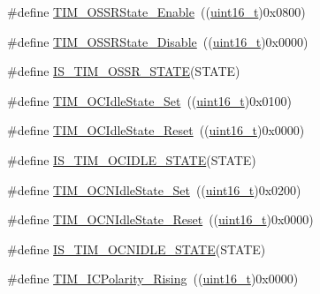 \begin{DoxyCompactItemize}
\#define \hyperlink{group___o_s_s_r___off___state___selection__for___run__mode__state_ga3703ba6189db045bec48c864289f997e}{T\+I\+M\+\_\+\+O\+S\+S\+R\+State\+\_\+\+Enable}~((\hyperlink{_p_e___types_8h_a1f1825b69244eb3ad2c7165ddc99c956}{uint16\+\_\+t})0x0800)
\item 
\#define \hyperlink{group___o_s_s_r___off___state___selection__for___run__mode__state_ga766dfd8b3c32ec1b8b446f0e2dbe7b97}{T\+I\+M\+\_\+\+O\+S\+S\+R\+State\+\_\+\+Disable}~((\hyperlink{_p_e___types_8h_a1f1825b69244eb3ad2c7165ddc99c956}{uint16\+\_\+t})0x0000)
\item 
\#define \hyperlink{group___o_s_s_r___off___state___selection__for___run__mode__state_ga48b4f15f6346e28087edbb9af2ba4f63}{I\+S\+\_\+\+T\+I\+M\+\_\+\+O\+S\+S\+R\+\_\+\+S\+T\+A\+TE}(S\+T\+A\+TE)
\item 
\#define \hyperlink{group___t_i_m___output___compare___idle___state_ga86d8f895a1ec584323f6c02c7edfad4c}{T\+I\+M\+\_\+\+O\+C\+Idle\+State\+\_\+\+Set}~((\hyperlink{_p_e___types_8h_a1f1825b69244eb3ad2c7165ddc99c956}{uint16\+\_\+t})0x0100)
\item 
\#define \hyperlink{group___t_i_m___output___compare___idle___state_gace5465bc9e90ba7862b3af9e6cc9b97e}{T\+I\+M\+\_\+\+O\+C\+Idle\+State\+\_\+\+Reset}~((\hyperlink{_p_e___types_8h_a1f1825b69244eb3ad2c7165ddc99c956}{uint16\+\_\+t})0x0000)
\item 
\#define \hyperlink{group___t_i_m___output___compare___idle___state_ga69c62dcc15f9d39108b19b64205d689e}{I\+S\+\_\+\+T\+I\+M\+\_\+\+O\+C\+I\+D\+L\+E\+\_\+\+S\+T\+A\+TE}(S\+T\+A\+TE)
\item 
\#define \hyperlink{group___t_i_m___output___compare___n___idle___state_ga980392da6eb5bedcbf7ed353e1073f99}{T\+I\+M\+\_\+\+O\+C\+N\+Idle\+State\+\_\+\+Set}~((\hyperlink{_p_e___types_8h_a1f1825b69244eb3ad2c7165ddc99c956}{uint16\+\_\+t})0x0200)
\item 
\#define \hyperlink{group___t_i_m___output___compare___n___idle___state_ga329a32820cdba0af9c4b7a04177e8fdd}{T\+I\+M\+\_\+\+O\+C\+N\+Idle\+State\+\_\+\+Reset}~((\hyperlink{_p_e___types_8h_a1f1825b69244eb3ad2c7165ddc99c956}{uint16\+\_\+t})0x0000)
\item 
\#define \hyperlink{group___t_i_m___output___compare___n___idle___state_ga0987091d1d03ba2db065efb66eff3951}{I\+S\+\_\+\+T\+I\+M\+\_\+\+O\+C\+N\+I\+D\+L\+E\+\_\+\+S\+T\+A\+TE}(S\+T\+A\+TE)
\item 
\#define \hyperlink{group___t_i_m___input___capture___polarity_gabe598596b7dbcac446a4918105fa95a6}{T\+I\+M\+\_\+\+I\+C\+Polarity\+\_\+\+Rising}~((\hyperlink{_p_e___types_8h_a1f1825b69244eb3ad2c7165ddc99c956}{uint16\+\_\+t})0x0000)

\end{DoxyCompactItemize}
